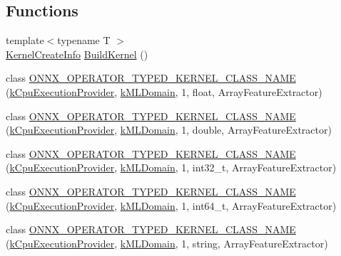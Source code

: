 \subsection*{Functions}
\begin{DoxyCompactItemize}
\item 
{\footnotesize template$<$typename T $>$ }\\\mbox{\hyperlink{structonnxruntime_1_1KernelCreateInfo}{Kernel\+Create\+Info}} \mbox{\hyperlink{namespaceonnxruntime_1_1ml_a69e87ba61c7aba52d53e7f222e453fe9}{Build\+Kernel}} ()
\item 
class \mbox{\hyperlink{namespaceonnxruntime_1_1ml_ae081b91c0e45719184dcf3c80c864de9}{O\+N\+N\+X\+\_\+\+O\+P\+E\+R\+A\+T\+O\+R\+\_\+\+T\+Y\+P\+E\+D\+\_\+\+K\+E\+R\+N\+E\+L\+\_\+\+C\+L\+A\+S\+S\+\_\+\+N\+A\+ME}} (\mbox{\hyperlink{namespaceonnxruntime_a394a3c7e50622de1f203a96df592060d}{k\+Cpu\+Execution\+Provider}}, \mbox{\hyperlink{namespaceonnxruntime_a76df7dd63759039fc62486d6691e70e5}{k\+M\+L\+Domain}}, 1, float, Array\+Feature\+Extractor)
\item 
class \mbox{\hyperlink{namespaceonnxruntime_1_1ml_a713c41118c4973db050ec0cce8210330}{O\+N\+N\+X\+\_\+\+O\+P\+E\+R\+A\+T\+O\+R\+\_\+\+T\+Y\+P\+E\+D\+\_\+\+K\+E\+R\+N\+E\+L\+\_\+\+C\+L\+A\+S\+S\+\_\+\+N\+A\+ME}} (\mbox{\hyperlink{namespaceonnxruntime_a394a3c7e50622de1f203a96df592060d}{k\+Cpu\+Execution\+Provider}}, \mbox{\hyperlink{namespaceonnxruntime_a76df7dd63759039fc62486d6691e70e5}{k\+M\+L\+Domain}}, 1, double, Array\+Feature\+Extractor)
\item 
class \mbox{\hyperlink{namespaceonnxruntime_1_1ml_a6e21d65250b79fabb8e617257799e5ce}{O\+N\+N\+X\+\_\+\+O\+P\+E\+R\+A\+T\+O\+R\+\_\+\+T\+Y\+P\+E\+D\+\_\+\+K\+E\+R\+N\+E\+L\+\_\+\+C\+L\+A\+S\+S\+\_\+\+N\+A\+ME}} (\mbox{\hyperlink{namespaceonnxruntime_a394a3c7e50622de1f203a96df592060d}{k\+Cpu\+Execution\+Provider}}, \mbox{\hyperlink{namespaceonnxruntime_a76df7dd63759039fc62486d6691e70e5}{k\+M\+L\+Domain}}, 1, int32\+\_\+t, Array\+Feature\+Extractor)
\item 
class \mbox{\hyperlink{namespaceonnxruntime_1_1ml_abb4aa917a23b43c6b954169e1c33a292}{O\+N\+N\+X\+\_\+\+O\+P\+E\+R\+A\+T\+O\+R\+\_\+\+T\+Y\+P\+E\+D\+\_\+\+K\+E\+R\+N\+E\+L\+\_\+\+C\+L\+A\+S\+S\+\_\+\+N\+A\+ME}} (\mbox{\hyperlink{namespaceonnxruntime_a394a3c7e50622de1f203a96df592060d}{k\+Cpu\+Execution\+Provider}}, \mbox{\hyperlink{namespaceonnxruntime_a76df7dd63759039fc62486d6691e70e5}{k\+M\+L\+Domain}}, 1, int64\+\_\+t, Array\+Feature\+Extractor)
\item 
class \mbox{\hyperlink{namespaceonnxruntime_1_1ml_a5cce4b7d507ae46a6fb6d742f65e9427}{O\+N\+N\+X\+\_\+\+O\+P\+E\+R\+A\+T\+O\+R\+\_\+\+T\+Y\+P\+E\+D\+\_\+\+K\+E\+R\+N\+E\+L\+\_\+\+C\+L\+A\+S\+S\+\_\+\+N\+A\+ME}} (\mbox{\hyperlink{namespaceonnxruntime_a394a3c7e50622de1f203a96df592060d}{k\+Cpu\+Execution\+Provider}}, \mbox{\hyperlink{namespaceonnxruntime_a76df7dd63759039fc62486d6691e70e5}{k\+M\+L\+Domain}}, 1, string, Array\+Feature\+Extractor)

\end{DoxyCompactItemize}
